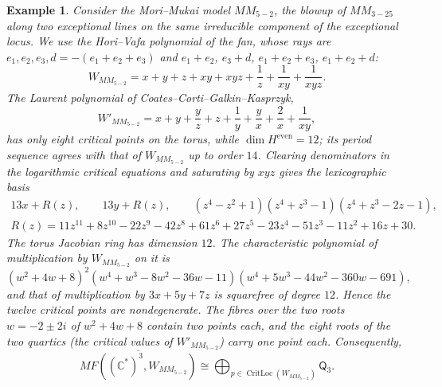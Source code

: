 \documentclass[11pt]{amsart}
\newtheorem{example}{Example}[section]
\DeclareMathOperator{\CritLoc}{CritLoc}
\newcommand{\MorseCat}[1]{\mathsf{Q}_{#1}}
\begin{document}
\begin{example}
Consider the Mori--Mukai model $MM_{5-2}$, the blowup of $MM_{3-25}$ along
two exceptional lines on the same irreducible component of the exceptional
locus.
We use the Hori--Vafa polynomial of the fan, whose rays are
$e_1,e_2,e_3,d=-(e_1+e_2+e_3)$ and $e_1+e_2$, $e_3+d$, $e_1+e_2+e_3$,
$e_1+e_2+d$:
\[
W_{MM_{5-2}}=x+y+z+xy+xyz+\frac{1}{z}+\frac{1}{xy}+\frac{1}{xyz}.
\]
The Laurent polynomial of Coates--Corti--Galkin--Kasprzyk,
\[
W'_{MM_{5-2}}=x+y+\frac{y}{z}+z+\frac{1}{y}+\frac{y}{x}+\frac{2}{x}+\frac{1}{xy},
\]
has only eight critical points on the torus, while
$\dim H^{\mathrm{even}}=12$; its period sequence agrees with that of
$W_{MM_{5-2}}$ up to order $14$.
Clearing denominators in the logarithmic critical equations and saturating
by $xyz$ gives the lexicographic basis
\[
\begin{gathered}
13x+R(z),\qquad 13y+R(z),\qquad
(z^4-z^2+1)(z^4+z^3-1)(z^4+z^3-2z-1),\\
R(z)=11z^{11}+8z^{10}-22z^9-42z^8+61z^6+27z^5-23z^4-51z^3-11z^2+16z+30.
\end{gathered}
\]
The torus Jacobian ring has dimension $12$. The characteristic polynomial of
multiplication by $W_{MM_{5-2}}$ on it is
\[
(w^2+4w+8)^2(w^4+w^3-8w^2-36w-11)(w^4+5w^3-44w^2-360w-691),
\]
and that of multiplication by $3x+5y+7z$ is squarefree of degree $12$. Hence
the twelve critical points are nondegenerate. The fibres over the two roots
$w=-2\pm2i$ of $w^2+4w+8$ contain two points each, and the eight roots of the
two quartics (the critical values of $W'_{MM_{5-2}}$) carry one point each.
Consequently,
\[
\overline{MF((\mathbb{C}^*)^3,W_{MM_{5-2}})}
\cong \bigoplus_{p\in\CritLoc(W_{MM_{5-2}})}\MorseCat{3}.
\]
\end{example}
\end{document}

